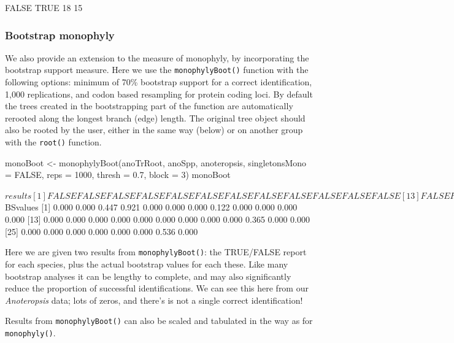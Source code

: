 \documentclass{article}
\newcommand{\fun}[1]{\texttt{#1}}
\begin{document}
\begin{Routput}
FALSE  TRUE 
   18    15
\end{Routput}

\subsubsection{Bootstrap monophyly}

We also provide an extension to the measure of monophyly, by incorporating the bootstrap support measure. Here we use the \fun{monophylyBoot()} function with the following options: minimum of 70\% bootstrap support for a correct identification, 1,000 replications, and codon based resampling for protein coding loci. By default the trees created in the bootstrapping part of the function are automatically rerooted along the longest branch (edge) length. The original tree object should also be rooted by the user, either in the same way (below) or on another group with the \fun{root()} function. 

\begin{console}
monoBoot <-  monophylyBoot(anoTrRoot, anoSpp, anoteropsis,
 singletonsMono = FALSE, reps = 1000, thresh = 0.7, block = 3)
monoBoot
\end{console}

\begin{Routput}
$results
 [1] FALSE FALSE FALSE FALSE FALSE FALSE FALSE FALSE FALSE FALSE FALSE FALSE
[13] FALSE FALSE FALSE FALSE FALSE FALSE FALSE FALSE FALSE FALSE

$BSvalues
 [1] 0.000 0.000 0.447 0.921 0.000 0.000 0.000 0.122 0.000 0.000 0.000 0.000
[13] 0.000 0.000 0.000 0.000 0.000 0.000 0.000 0.000 0.000 0.365 0.000 0.000
[25] 0.000 0.000 0.000 0.000 0.000 0.000 0.536 0.000
\end{Routput}

Here we are given two results from \fun{monophylyBoot()}: the TRUE/FALSE report for each species, plus the actual bootstrap values for each these. Like many bootstrap analyses it can be lengthy to complete, and may also significantly reduce the proportion of successful identifications. We can see this here from our \emph{Anoteropsis} data; lots of zeros, and there's is not a single correct identification!

Results from \fun{monophylyBoot()} can also be scaled and tabulated in the way as for \fun{monophyly()}. 

\end{document}
